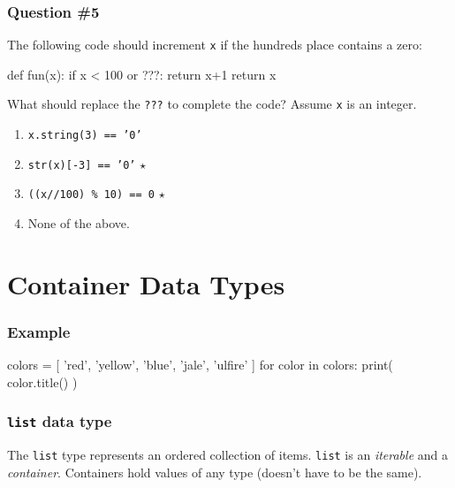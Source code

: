 \documentclass[11pt]{beamer}
\begin{document}
\begin{frame}[fragile]
  \frametitle{Question \#5}
  \Enlarge

  The following code should increment \texttt{x} if the hundreds place contains a zero:
  \begin{semiverbatim}
def fun(x):
    if x < 100 or ???:
        return x+1
    return x
  \end{semiverbatim}
  What should replace the \texttt{???} to complete the code?  Assume \texttt{x} is an integer.
  \begin{enumerate}[label=\Alph*]
  \item  \texttt{x.string(3) == '0'}
  \item  \texttt{str(x)[-3] == '0'}  $\star$
  \item  \texttt{((x//100) \% 10) == 0}  $\star$
  \item  None of the above.
  \end{enumerate}
\end{frame}

\section{Container Data Types}

\begin{frame}[fragile]
  \frametitle{Example}
  \Enlarge

  \begin{semiverbatim}
colors = [ 'red', 'yellow', 'blue',
           'jale', 'ulfire' ]
for color in colors:
    print( color.title() )
  \end{semiverbatim}
\end{frame}

\begin{frame}[fragile]
  \frametitle{\texttt{list} data type}
  \Enlarge

  \begin{itemize}
  \myitem  The \texttt{list} type represents an ordered collection of items. %
  \myitem  \texttt{list} is an \emph{iterable} and a \emph{container}. %
  \myitem  Containers hold values of any type (doesn't have to be the same).
  \end{itemize}
\end{frame}
\end{document}

